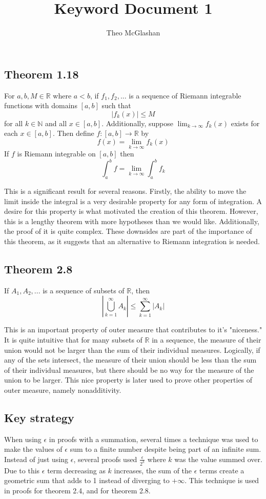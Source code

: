 \documentclass[12pt]{article}
\title{Keyword Document 1}
\author{Theo McGlashan}
\date{}
\begin{document}
\maketitle

\subsection*{Theorem 1.18} For $a, b, M \in \mathbb{R}$ where $a < b$, if $f_1, f_2,...$ is a sequence of Riemann integrable functions with domains $[a, b]$ such that $$|f_k (x)| \leq M$$ for all $k \in \mathbb{N}$ and all $x \in [a, b]$. Additionally, suppose $\lim_{k \to \infty} f_k(x)$ exists for each $x \in [a, b]$. Then define $f : [a, b] \to \mathbb{R}$ by $$f(x) = \lim_{k \to \infty} f_k(x)$$ If $f$ is Riemann integrable on $[a, b]$ then $$\int_a^b f = \lim_{k \to \infty} \int_a^b f_k$$

This is a significant result for several reasons. Firstly, the ability to move the limit inside the integral is a very desirable property for any form of integration. A desire for this property is what motivated the creation of this theorem. However, this is a lengthy theorem with more hypotheses than we would like. Additionally, the proof of it is quite complex. These downsides are part of the importance of this theorem, as it suggests that an alternative to Riemann integration is needed.

\subsection*{Theorem 2.8} If $A_1, A_2,...$ is a sequence of subsets of $\mathbb{R}$, then $$\left| \bigcup_{k=1}^\infty A_k \right| \leq \sum_{k=1}^\infty |A_k|$$

This is an important property of outer measure that contributes to it's "niceness." It is quite intuitive that for many subsets of $\mathbb{R}$ in a sequence, the measure of their union would not be larger than the sum of their individual measures. Logically, if any of the sets intersect, the measure of their union should be less than the sum of their individual measures, but there should be no way for the measure of the union to be larger. This nice property is later used to prove other properties of outer measure, namely nonadditivity. 

\subsection*{Key strategy} When using $\epsilon$ in proofs with a summation, several times a technique was used to make the values of $\epsilon$ sum to a finite number despite being part of an infinite sum. Instead of just using $\epsilon$, several proofs used $\frac{\epsilon}{2^k}$ where $k$ was the value summed over. Due to this $\epsilon$ term decreasing as $k$ increases, the sum of the $\epsilon$ terms create a geometric sum that adds to 1 instead of diverging to $+ \infty$. This technique is used in proofs for theorem 2.4, and for theorem 2.8.
\end{document}

